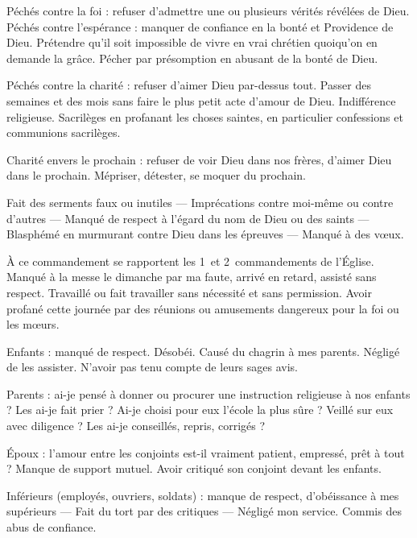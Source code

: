 Péchés contre la foi : refuser d’admettre
une ou plusieurs vérités révélées de Dieu.
Péchés contre l’espérance : manquer de
confiance en la bonté et Providence de
Dieu. Prétendre qu’il soit impossible de
vivre en vrai chrétien quoiqu’on en demande la grâce. Pécher par présomption
en abusant de la bonté de Dieu.

Péchés contre la charité : refuser d’aimer
Dieu par-dessus tout. Passer des semaines
et des mois sans faire le plus petit acte
d’amour de Dieu. Indifférence religieuse.
Sacrilèges en profanant les choses saintes,
en particulier confessions et communions
sacrilèges.

Charité envers le prochain : refuser de
voir Dieu dans nos frères, d’aimer Dieu
dans le prochain. Mépriser, détester, se
moquer du prochain.


Fait des serments faux ou inutiles — Imprécations contre moi-même ou contre
d’autres — Manqué de respect à l’égard
du nom de Dieu ou des saints — Blasphémé en murmurant contre Dieu dans
les épreuves — Manqué à des vœux.


À ce commandement se rapportent les 1\ier\ et 2\ieme\ commandements de l’Église.
Manqué à la messe le dimanche par ma faute, arrivé
en retard, assisté sans respect. Travaillé
ou fait travailler sans nécessité et sans
permission. Avoir profané
cette journée par des réunions ou amusements dangereux pour la foi ou les
mœurs.


Enfants : manqué de respect. Désobéi.
Causé du chagrin à mes parents. Négligé
de les assister. N’avoir pas tenu compte de
leurs sages avis.

Parents : ai-je pensé à donner ou procurer
une instruction religieuse à nos enfants ?
Les ai-je fait prier ? Ai-je choisi pour eux
l’école la plus sûre ? Veillé sur eux avec
diligence ? Les ai-je conseillés, repris,
corrigés ?

Époux : l’amour entre les conjoints est-il
vraiment patient, empressé, prêt à tout ?
Manque de support mutuel. Avoir critiqué
son conjoint devant les enfants.

Inférieurs (employés, ouvriers, soldats) :
manque de respect, d’obéissance à mes
supérieurs — Fait du tort par des critiques
— Négligé mon service. Commis des abus
de confiance.

